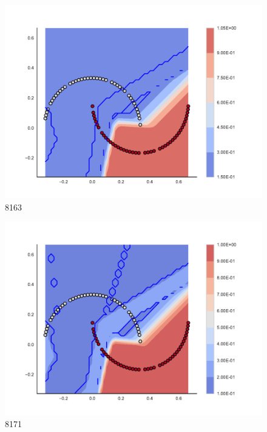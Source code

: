 \begin{subfigure}[b]{0.09\textwidth}
    \includegraphics[clip, trim=2.35cm 1.75cm 4.5cm 0cm,width=\textwidth]{img/convergence/8163.pdf}
    \caption{8163}
    \label{fig:convergence_8163}
\end{subfigure}
%
\begin{subfigure}[b]{0.09\textwidth}
    \includegraphics[clip, trim=2.35cm 1.75cm 4.5cm 0cm,width=\textwidth]{img/convergence/8171.pdf}
    \caption{8171}
    \label{fig:convergence_8171}
\end{subfigure}
%
